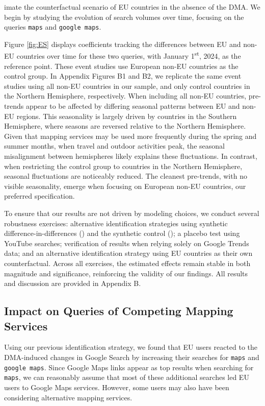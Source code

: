 \documentclass[11pt]{article}
\begin{document}
	\clearpage
	
	\noindent imate the counterfactual scenario of EU countries in the absence of the DMA. We begin by studying the evolution of search volumes over time, focusing on the queries \texttt{maps} and \texttt{google maps}.
	
	Figure \ref{fig:ES} displays coefficients tracking the differences between EU and non-EU countries over time for these two queries, with January 1\textsuperscript{st}, 2024, as the reference point. These event studies use European non-EU countries as the control group. In Appendix Figures B1 and B2, we replicate the same event studies using all non-EU countries in our sample, and only control countries in the Northern Hemisphere, respectively. When including all non-EU countries, pre-trends appear to be affected by differing seasonal patterns between EU and non-EU regions. This seasonality is largely driven by countries in the Southern Hemisphere, where seasons are reversed relative to the Northern Hemisphere. Given that mapping services may be used more frequently during the spring and summer months, when travel and outdoor activities peak, the seasonal misalignment between hemispheres likely explains these fluctuations. In contrast, when restricting the control group to countries in the Northern Hemisphere, seasonal fluctuations are noticeably reduced. The cleanest pre-trends, with no visible seasonality, emerge when focusing on European non-EU countries, our preferred specification. 
	
	
	To ensure that our results are not driven by modeling choices, we conduct several robustness exercises:  alternative identification strategies using synthetic difference-in-differences (\citealp{synthetic_did}) and the synthetic control (\citealp{synthetic_control}); a placebo test using YouTube searches; verification of results when relying solely on Google Trends data; and an alternative identification strategy using EU countries as their own counterfactual. Across all exercises, the estimated effects remain stable in both magnitude and significance, reinforcing the validity of our findings. All results and discussion are provided in Appendix B.
	
	
	\subsection{Impact on Queries of Competing Mapping Services}\label{subsec:competition}
	
	Using our previous identification strategy, we found that EU users reacted to the DMA-induced changes in Google Search by increasing their searches for \texttt{maps} and \texttt{google maps}. Since Google Maps links appear as top results when searching for \texttt{maps}, we can reasonably assume that most of these additional searches led EU users to Google Maps services. However, some users may also have been considering alternative mapping services.
	
\end{document}
